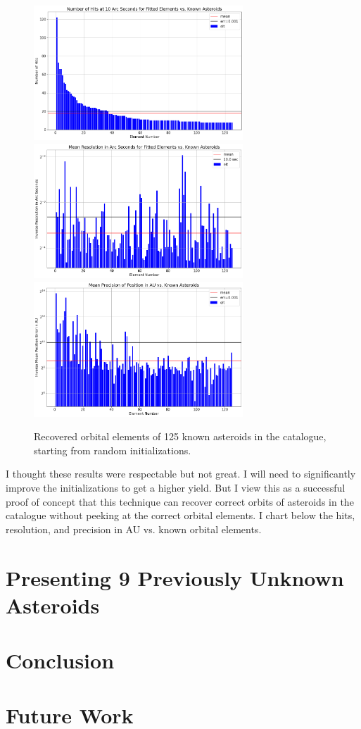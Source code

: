 \begin{figure}[h]
\begin{center}
\includegraphics[width=0.70\textwidth]{../figs/search_known/random/hits.png}
\includegraphics[width=0.70\textwidth]{../figs/search_known/random/resolution.png}
\includegraphics[width=0.70\textwidth]{../figs/search_known/random/near_ast_dist.png}
\caption{Recovered orbital elements of 125 known asteroids in the catalogue, starting from random initializations.}
\end{center}
\end{figure}
\clearpage
I thought these results were respectable but not great.
I will need to significantly improve the initializations to get a higher yield.
But I view this as a successful proof of concept that this technique can recover correct orbits of asteroids 
in the catalogue without peeking at the correct orbital elements.
I chart below the hits, resolution, and precision in AU vs. known orbital elements.

\section{Presenting 9 Previously Unknown Asteroids}
\label{section_results_unknown_ast}

\section{Conclusion}
\label{search_conclusion}

\section{Future Work}
\label{section_future_work}

